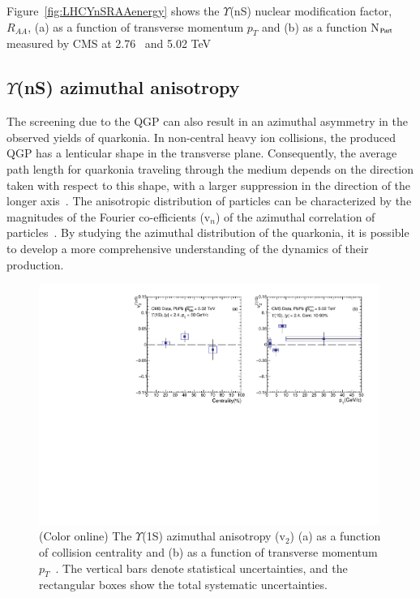 Figure~\ref{fig:LHCYnSRAAenergy} shows 
  the $\Upsilon$(nS) nuclear modification factor, $R_{AA}$, (a) as a function of transverse momentum $p_{T}$
  and (b) as a function N$_{\rm Part}$ measured by CMS
    at 2.76~\cite{Khachatryan:2016xxp} and 5.02 TeV~\cite{CMS:2018zza}
  

  
    
\subsection{$\Upsilon$(nS) azimuthal anisotropy}

The screening due to the QGP can also result in an azimuthal asymmetry in the observed yields of quarkonia. In non-central
heavy ion collisions, the produced QGP has a lenticular shape in the transverse plane. Consequently, the average path length
for quarkonia traveling through the medium depends on the direction taken with respect to this shape, with a larger suppression
in the direction of the longer axis~\cite{He:2015hfa}. The anisotropic distribution of particles can be characterized by the magnitudes
of the Fourier co-efficients (v$_{n}$) of the azimuthal correlation of particles~\cite{Voloshin:1994mz}. By studying the
azimuthal distribution of the quarkonia, it is possible to develop a more comprehensive understanding of the dynamics of their
production.

\begin{figure}
\includegraphics[width=0.99\textwidth]{Figures/ExpOverview/Fig_CMS_Y1S_5TeV_V2.pdf}
\caption{(Color online) The $\Upsilon$(1S) azimuthal anisotropy (v$_{2}$) (a) as a function of collision centrality and 
  (b) as a function of transverse momentum $p_{T}$~\cite{CMS:2020efs}. The vertical bars denote statistical uncertainties,
  and the rectangular boxes show the total systematic uncertainties.
}
\label{fig:Upsilon1SV2CMS}
\end{figure}



